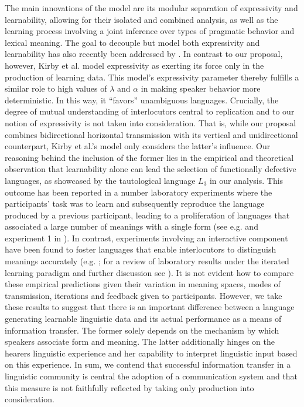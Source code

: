 \documentclass[a4paper]{article}
\begin{document}
The main innovations of the model are its modular separation of expressivity and learnability, allowing for their isolated and combined analysis, as well as the learning process involving a joint inference over types of pragmatic behavior and lexical meaning. The goal to decouple but model both expressivity and learnability has also recently been addressed by \citet{kirby+etal:2015}. In contrast to our proposal, however, Kirby et al. model expressivity as exerting its force only in the production of learning data. This model's expressivity parameter thereby fulfills a similar role  to high values of $\lambda$ and $\alpha$ in making speaker behavior more deterministic. In this way, it ``favors'' unambiguous languages. Crucially, the degree of mutual understanding of interlocutors central to replication and to our notion of expressivity is not taken into consideration. That is, while our proposal combines bidirectional horizontal transmission with its vertical and unidirectional counterpart, Kirby et al.'s model only considers the latter's influence. Our reasoning behind the inclusion of the former lies in the empirical and theoretical observation that learnability alone can lead the selection of functionally defective languages, as showcased by the tautological language $L_3$ in our analysis. This outcome has been reported in a number laboratory experiments where the participants' task was to learn and subsequently reproduce the language produced by a previous participant, leading to a proliferation of languages that associated a large number of meanings with a single form (see e.g. \citealt{silvey+etal:2014} and experiment 1 in \citealt{kirby+etal:2008}). In contrast, experiments involving an interactive component have been found to foster languages that enable interlocutors to distinguish meanings accurately  (e.g. \citealt{fay+etal:2013}; for a review of laboratory results under the iterated learning paradigm and further discussion see \citealt{kirby+etal:2015, tamariz+kirby:2016}). It is not evident how to compare these empirical predictions given their variation in meaning spaces, modes of transmission, iterations and feedback given to participants. However, we take these results to suggest that there is an important difference between a language generating learnable linguistic data and its actual performance as a means of information transfer. The former solely depends on the mechanism by which speakers associate form and meaning. The latter additionally hinges on the hearers linguistic experience and her capability to interpret linguistic input based on this experience. In sum, we contend that successful information transfer in a linguistic community is central the adoption of a communication system and that this measure is not faithfully reflected by taking only production into consideration.
\end{document}
